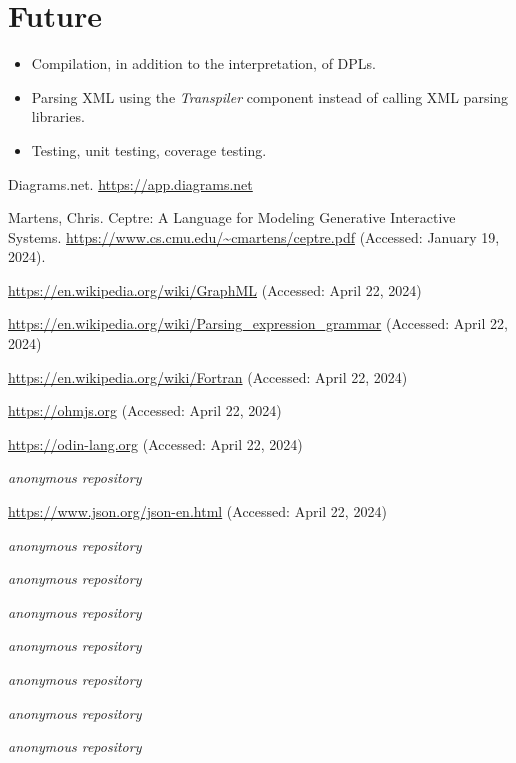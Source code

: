 \documentclass[10pt,anonymous,review]{acmart}
\begin{document}
\section{Future}
\begin{itemize}
\item Compilation, in addition to the interpretation, of DPLs.

\item Parsing XML using the \emph{Transpiler} component instead of calling XML parsing libraries.

\item Testing, unit testing, coverage testing.

\end{itemize}

\begin{thebibliography}{9}

Diagrams.net.
\url{https://app.diagrams.net}

Martens, Chris. Ceptre: A Language for Modeling Generative Interactive Systems. \url{https://www.cs.cmu.edu/~cmartens/ceptre.pdf} (Accessed: January 19, 2024).

\url{https://en.wikipedia.org/wiki/GraphML} (Accessed: April 22, 2024)

\url{https://en.wikipedia.org/wiki/Parsing_expression_grammar} (Accessed: April 22, 2024)

\url{https://en.wikipedia.org/wiki/Fortran} (Accessed: April 22, 2024)

\url{https://ohmjs.org} (Accessed: April 22, 2024)

\url{https://odin-lang.org} (Accessed: April 22, 2024)

\emph{anonymous repository}

\url{https://www.json.org/json-en.html} (Accessed: April 22, 2024)

\emph{anonymous repository}

\emph{anonymous repository}

\emph{anonymous repository}

\emph{anonymous repository}

\emph{anonymous repository}

\emph{anonymous repository}

\emph{anonymous repository}


\end{thebibliography}
\end{document}
